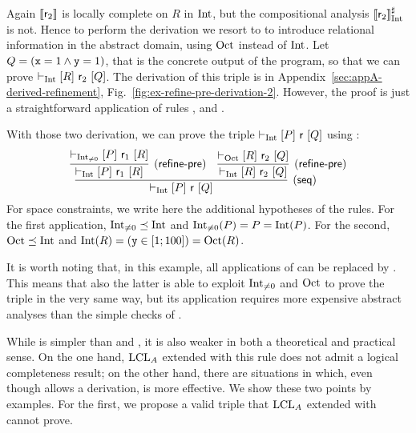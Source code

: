 \begin{example}
	Again $\llbracket\mathsf{r}_2\rrbracket$ is locally complete on $R$ in $\text{Int}$, but the compositional analysis $\llbracket\mathsf{r}_2\rrbracket^{\sharp}_{\text{Int}}$ is not. Hence to perform the derivation we resort to  to introduce relational information in the abstract domain, using $\text{Oct}$ instead of $\text{Int}$. Let $Q = (\texttt{x} = 1 \land \texttt{y} = 1)$, that is the concrete output of the program, so that we can prove $\vdash_{\text{Int}}\nobreak[R]~\mathsf{r}_2~[Q]$.
	The derivation of this triple is in Appendix~\ref{sec:appA-derived-refinement}, Fig.~\ref{fig:ex-refine-pre-derivation-2}. However, the proof is just a straightforward application of rules ,  and .
	
	With those two derivation, we can prove the triple $\vdash_{\text{Int}}\nobreak[P]~\mathsf{r}~[Q]$ using :
	\[
	\infer[(\mathsf{seq})]
	{\lcl{\Int}{P}{\regr}{Q}}
	{
		\infer[(\mathsf{refine\mbox{-}pre})]
		{\lcl{\Int}{P}{\regr_1}{R}}
		{\lcl{\Int_{\neq 0}}{P}{\regr_1}{R}}
		&
		\infer[(\mathsf{refine\mbox{-}pre})]
		{\lcl{\Int}{R}{\regr_2}{Q}}
		{\lcl{\Oct}{R}{\regr_2}{Q}}
	}
	\]
	For space constraints, we write here the additional hypotheses of the rules. For the first application, $\text{Int}_{\neq 0} \preceq \text{Int}$ and $\text{Int}_{\neq 0}(P) = P = \text{Int}(P)$. For the second, $\text{Oct} \preceq \text{Int}$ and $\text{Int}(R) = (\texttt{y} \in [1; 100]) = \text{Oct}(R)$.
	
	It is worth noting that, in this example, all applications of  can be replaced by . This means that also the latter is able to exploit $\text{Int}_{\neq 0}$ and $\text{Oct}$ to prove the triple in the very same way, but its application requires more expensive abstract analyses than the simple checks of .
\end{example}

While  is simpler than  and , it is also weaker in both a theoretical and practical sense. On the one hand, $\text{LCL}_A$ extended with this rule does not admit a logical completeness result; on the other hand, there are situations in which, even though  allows a derivation,  is more effective. We show these two points by examples.
For the first, we propose a valid triple that $\text{LCL}_A$ extended with  cannot prove.


